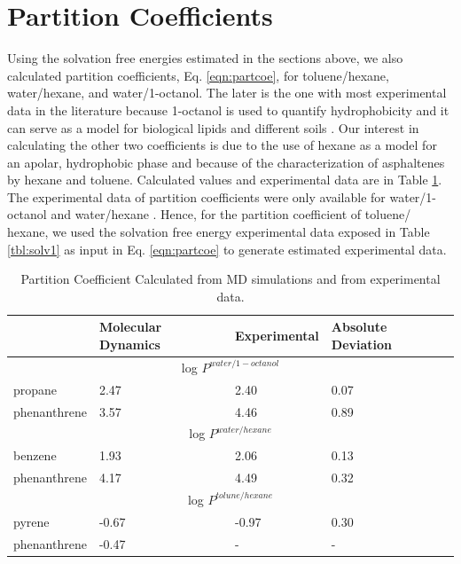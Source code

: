 \section{Partition Coefficients}

Using the solvation free energies estimated in the sections above, we also calculated partition coefficients, Eq. \eqref{eqn:partcoe}, for toluene/hexane, water/hexane, and water/1-octanol. The later is the one with most experimental data in the literature because 1-octanol is used to quantify hydrophobicity and it can serve as a model for biological lipids and different soils \cite{RUELLE2000457}. Our interest in calculating the other two coefficients is due to the use of hexane as a model for an apolar, hydrophobic phase and because of the characterization of asphaltenes by hexane and toluene. Calculated values and experimental data are in Table \ref{tbl:part}. The experimental data of partition coefficients  were only available for water/1-octanol  \cite{POOLE2000117,sangster} and water/hexane \cite{doi:10.1021/je970112e}. Hence, for the partition coefficient of toluene/ hexane, we used the solvation free energy experimental data exposed in Table \ref{tbl:solv1} as input in Eq. \eqref{eqn:partcoe} to generate estimated experimental data.


\begin{table}[H]
    \centering
    \caption{Partition Coefficient Calculated from MD simulations and from experimental data.}
    \label{tbl:part}
    \begin{tabular}{llll}
    	\hline\hline
    	             & {Molecular Dynamics} & {Experimental} & Absolute Deviation \\ \hline
    	              \multicolumn{4}{c}{log $P^{water/1-octanol}$}               \\ \hline
    	propane      & 2.47                 & 2.40           & 0.07               \\
    	phenanthrene & 3.57                 & 4.46           & 0.89               \\ \hline
    	               \multicolumn{4}{c}{log $P^{water/hexane}$}                 \\ \hline
    	benzene      & 1.93                 & 2.06           & 0.13               \\
    	phenanthrene & 4.17                 & 4.49           & 0.32               \\ \hline
    	               \multicolumn{4}{c}{log $P^{tolune/hexane}$}                \\ \hline
    	pyrene       & -0.67                & -0.97          & 0.30               \\
    	phenanthrene & -0.47                & -              & -                  \\ \hline\hline
    \end{tabular}
    
\end{table}

